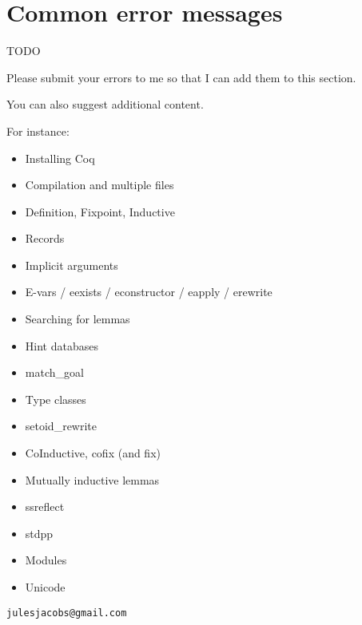 \section{Common error messages}

TODO

Please submit your errors to me so that I can add them to this section.

You can also suggest additional content.

For instance:

\begin{itemize}
  \item Installing Coq
  \item Compilation and multiple files
  \item Definition, Fixpoint, Inductive
  \item Records
  \item Implicit arguments
  \item E-vars / eexists / econstructor / eapply / erewrite
  \item Searching for lemmas
  \item Hint databases
  \item match\_goal
  \item Type classes
  \item setoid\_rewrite
  \item CoInductive, cofix (and fix)
  \item Mutually inductive lemmas
  \item ssreflect
  \item stdpp
  \item Modules
  \item Unicode
\end{itemize}

\texttt{julesjacobs@gmail.com}





